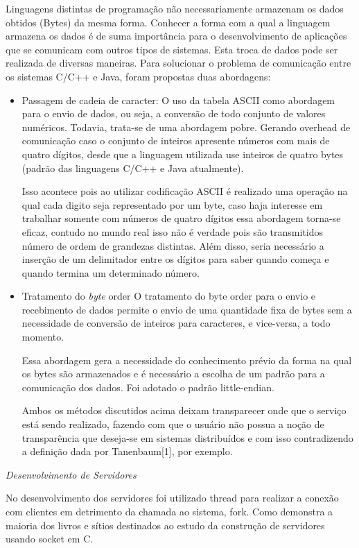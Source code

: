 \documentclass[12pt,a4paper]{article}
\begin{document}
Linguagens distintas de programação não necessariamente armazenam os dados obtidos (Bytes) da mesma forma. Conhecer a forma com a qual a linguagem armazena os dados é de suma importância para o desenvolvimento de aplicações que se comunicam com outros tipos de sistemas.
Esta troca de dados pode ser realizada de diversas maneiras. Para solucionar o problema de comunicação entre os sistemas C/C++ e Java, foram propostas duas abordagens:
\begin{itemize}

\item{Passagem de cadeia de caracter:}
O uso da tabela ASCII como abordagem para o envio de dados, ou seja, a conversão de todo conjunto de valores numéricos. Todavia, trata-se de uma abordagem pobre. Gerando overhead de comunicação caso o conjunto de inteiros apresente números com mais de quatro dígitos, desde que a linguagem utilizada use inteiros de quatro bytes (padrão das linguagens C/C++ e Java atualmente).

Isso acontece pois ao utilizar codificação ASCII é realizado uma operação na qual cada digito seja representado por um byte, caso haja interesse em trabalhar somente com números de quatro dígitos essa abordagem torna-se eficaz, contudo no mundo real isso não é verdade pois são transmitidos número de ordem de grandezas distintas. Além disso, seria necessário a inserção de um delimitador entre os dígitos para saber quando começa e quando termina um determinado número.

\item{Tratamento do \textit{byte} order}
O tratamento do byte order para o envio e recebimento de dados permite o envio de uma quantidade fixa de bytes sem a necessidade de conversão de inteiros para caracteres, e vice-versa, a todo momento.

Essa abordagem gera a necessidade do conhecimento prévio da forma na qual os bytes são armazenados e é necessário a escolha de um padrão para a comunicação dos dados. Foi adotado o padrão little-endian.

Ambos os métodos discutidos acima deixam transparecer onde que o serviço está sendo realizado, fazendo com que o usuário não possua a noção de transparência que deseja-se em sistemas distribuídos e com isso contradizendo a definição dada por Tanenbaum[1], por exemplo.
\end{itemize}

\textit{\Large{Desenvolvimento de Servidores}}

No desenvolvimento dos servidores foi utilizado thread para realizar a conexão com clientes em detrimento da chamada ao sistema, fork. Como demonstra a maioria dos livros e sítios destinados ao estudo da construção de servidores usando socket em C.
\end{document}

